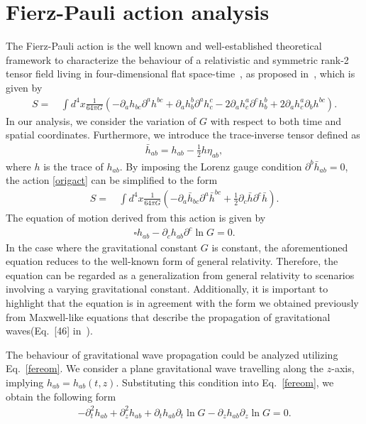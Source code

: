 \documentclass[prd,aps,a4paper,superscriptaddress,onecolumn,nofootinbib]{revtex4}
\begin{document}
\section{Fierz-Pauli action analysis}
\label{sec2}
The Fierz-Pauli action is the well known  and well-established theoretical framework to characterize the behaviour of a relativistic and symmetric rank-2 tensor field living in four-dimensional flat space-time~\cite{PhysRevD.82.044020,2021EPJC...81..171G}, as proposed in~\cite{PhysRevD.102.084045},  which is given by
\begin{equation}
\begin{aligned}
S = & \, \int d^4 x\frac{1}{64 \pi G}\left(-\partial_a h_{b c} \partial^a h^{b c}+\partial_a h_b^b \partial^a h_c^c-2 \partial_a h_c^a \partial^c h_b^b+2 \partial_a h_c^a \partial_b h^{b c}\right).\label{origact}
\end{aligned}
\end{equation}
In our analysis, we consider the variation of $G$ with respect to both time and spatial coordinates. Furthermore, we introduce the trace-inverse tensor defined as
\begin{align}
\bar{h}_{ab}=h_{ab}-\frac{1}{2}h\eta_{ab},
\end{align}
where $h$ is the trace of $h_{ab}$.
By imposing the Lorenz gauge condition $\partial^b \bar{h}_{ab} = 0$, the action \eqref{origact} can be simplified to the form
\begin{equation}
\begin{aligned}
S = & \,\int d^4 x\frac{1}{64 \pi G} \left( -\partial_a\bar{h}_{bc}\partial^a\bar{h}^{bc} + \frac{1}{2}\partial_c\bar{h}\partial^c\bar{h} \right).
\end{aligned}
\end{equation}
The equation of motion derived from this action is given by
\begin{align}
\square h_{ab} - \partial_ch_{ab}\partial^c\ln G = 0. \label{fereom}
\end{align}
In the case where the gravitational constant $G$ is constant, the aforementioned equation reduces to the well-known form of general relativity. Therefore, the equation can be regarded as a generalization from general relativity to scenarios involving a varying gravitational constant.
Additionally, it is important to highlight that the equation is in agreement with the form we obtained previously from Maxwell-like equations that describe the propagation of gravitational waves(Eq.~[46] in~\cite{An}).

The behaviour of gravitational wave propagation could be analyzed utilizing Eq.~\eqref{fereom}. We consider a plane gravitational wave travelling along the $z$-axis, implying $h_{ab} = h_{ab}(t,z)$. Substituting this condition into Eq.~\eqref{fereom}, we obtain the following form
\begin{align}
-\partial_t^2 h_{ab}+\partial_z^2 h_{ab} + \partial_t h_{ab} \partial_t\ln G - \partial_z h_{ab} \partial_z\ln G = 0. \label{ferorg}
\end{align}
\end{document}

